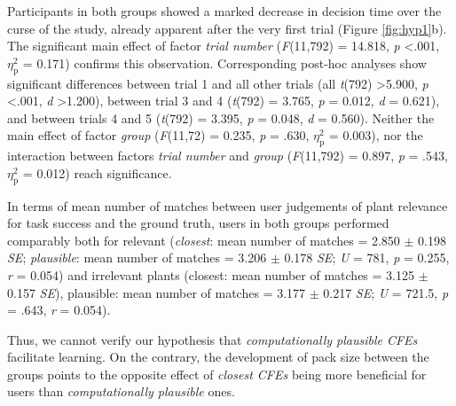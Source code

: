 Participants in both groups showed a marked decrease in decision time over the curse of the study, already apparent after the very first trial (Figure \ref{fig:hyp1}b).
The significant main effect of factor \textit{trial number} (\textit{F}(11,792) = 14.818, \textit{p} \textless .001, $\eta_{\text{p}}^{2}$ = 0.171) confirms this observation.
Corresponding post-hoc analyses show significant differences between trial 1 and all other trials (all \textit{t}(792) \textgreater 5.900, \textit{p} \textless .001, \textit{d} \textgreater 1.200), between trial 3 and 4 (\textit{t}(792) = 3.765, \textit{p} = 0.012, \textit{d} = 0.621), and between trials 4 and 5 (\textit{t}(792) = 3.395, \textit{p} = 0.048, \textit{d} = 0.560).
Neither the main effect of factor \textit{group} (\textit{F}(11,72) = 0.235, \textit{p} = .630, $\eta_{\text{p}}^{2}$ = 0.003), nor the interaction between factors \textit{trial number} and \textit{group} (\textit{F}(11,792) = 0.897, \textit{p} = .543, $\eta_{\text{p}}^{2}$ = 0.012) reach significance.

In terms of mean number of matches between user judgements of plant relevance for task success and the ground truth, users in both groups performed comparably both for relevant 
(\textit{closest}: mean number of matches = 2.850 $\pm$ 0.198 \textit{SE}; \textit{plausible}: mean number of matches = 3.206 $\pm$ 0.178 \textit{SE}; \textit{U} = 781, \textit{p} = 0.255, \textit{r} = 0.054)
and irrelevant plants (closest: mean number of matches = 3.125 $\pm$ 0.157 \textit{SE}), plausible: mean number of matches = 3.177 $\pm$ 0.217 \textit{SE}; \textit{U} = 721.5, \textit{p} = .643, \textit{r} = 0.054).

Thus, we cannot verify our hypothesis that \textit{computationally plausible \glspl{CFE}} facilitate learning. On the contrary, the development of pack size between the groups points to the opposite effect of \textit{closest \glspl{CFE}} being more beneficial for users than \textit{computationally plausible} ones.


